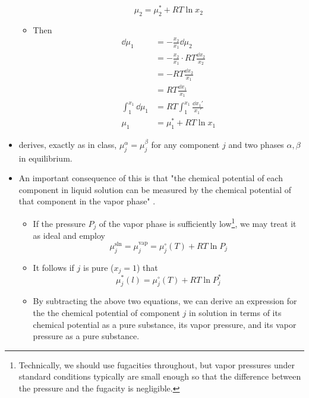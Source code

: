 \documentclass[../notes.tex]{subfiles}
\begin{document}
\begin{itemize}
\begin{itemize}
        \begin{equation*}
            \mu_2 = \mu_2^*+RT\ln x_2
        \end{equation*}
        \item Then
        \begin{align*}
            \dd{\mu_1} &= -\frac{x_2}{x_1}\dd{\mu_2}\\
            &= -\frac{x_2}{x_1}\cdot RT\frac{\dd{x_2}}{x_2}\\
            &= -RT\frac{\dd{x_2}}{x_1}\\
            &= RT\frac{\dd{x_1}}{x_1}\\
            \int_1^{x_1}\dd{\mu_1} &= RT\int_1^{x_1}\frac{\dd{x_1'}}{x_1'}\\
            \mu_1 &= \mu_1^*+RT\ln x_1
        \end{align*}
    \end{itemize}
    \item \textcite{bib:McQuarrieSimon} derives, exactly as in class, $\mu_j^\alpha=\mu_j^\beta$ for any component $j$ and two phases $\alpha,\beta$ in equilibrium.
    \item An important consequence of this is that "the chemical potential of each component in liquid solution can be measured by the chemical potential of that component in the vapor phase" \parencite[970]{bib:McQuarrieSimon}.
    \begin{itemize}
        \item If the pressure $P_j$ of the vapor phase is sufficiently low\footnote{Technically, we should use fugacities throughout, but vapor pressures under standard conditions typically are small enough so that the difference between the pressure and the fugacity is negligible.}, we may treat it as ideal and employ
        \begin{equation*}
            \mu_j^\text{sln} = \mu_j^\text{vap}
            = \mu_j^\circ(T)+RT\ln P_j
        \end{equation*}
        \item It follows if $j$ is pure ($x_j=1$) that
        \begin{equation*}
            \mu_j^*(l) = \mu_j^\circ(T)+RT\ln P_j^*
        \end{equation*}
        \item By subtracting the above two equations, we can derive an expression for the the chemical potential of component $j$ in solution in terms of its chemical potential as a pure substance, its vapor pressure, and its vapor pressure as a pure substance.

\end{itemize}
\end{itemize}
\end{document}
